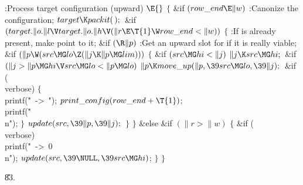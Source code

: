 \B{}:Process target configuration  (upward)%
\X${}\E{}$\6
${}\{{}$\1\6
\&{if} ${}(\\{row\_end}\E\|w){}$\1\5
:Canonize the configuration\X;\2\6
${}\\{target}\K\\{packit}(\,);{}$\6
\&{if} ${}(\\{target}.\|o.\|l\V\\{target}.\|o.\|h\V(\|r\E\T{1}\W\\{row\_end}<%
\|w)){}$\5
${}\{{}$\1\6
:If  is already present, make  point to it\X;\6
\&{if} ${}(\R\|p){}$\1\5
:Get an upward slot for  if it is really viable\X;\2\6
\&{if} ${}(\|p\W(\\{src}\MG\\{lo}\Z(\|j\K\|p\MG\\{lim}))){}$\5
${}\{{}$\1\6
\&{if} ${}(\\{src}\MG\\{hi}<\|j){}$\1\5
${}\|j\K\\{src}\MG\\{hi};{}$\2\6
\&{if} ${}(\|j>\|p\MG\\{hi}\V\\{src}\MG\\{lo}<\|p\MG\\{lo}){}$\1\5
${}\|p\K\\{move\_up}(\|p,\39\\{src}\MG\\{lo},\39\|j);{}$\2\6
\&{if} (\\{verbose})\5
${}\{{}$\1\6
\\{printf}(\.{"\ ->\ "});\5
${}\\{print\_config}(\\{row\_end}+\T{1}){}$;\5
\\{printf}(\.{"\\n"});\6
\4${}\}{}$\2\6
${}\\{update}(\\{src},\39\|p,\39\|j);{}$\6
\4${}\}{}$\2\6
\4${}\}{}$\5
\2\&{else} \&{if} ${}(\|r>\|w){}$\5
${}\{{}$\1\6
\&{if} (\\{verbose})\1\5
\\{printf}(\.{"\ ->\ 0\\n"});\2\6
${}\\{update}(\\{src},\39\NULL,\39\\{src}\MG\\{hi}){}$;\6
\4${}\}{}$\2\6
\4${}\}{}$\2\par
\U83.\fi

